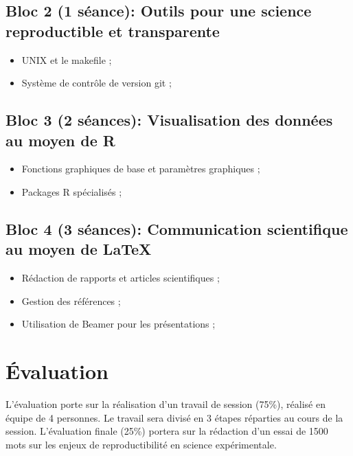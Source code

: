 \documentclass[12]{article}
\begin{document}
	\subsection*{Bloc 2 (1 séance): Outils pour une science reproductible et transparente}

	\begin{itemize}
	\renewcommand{\labelitemi}{$\bullet$}	
		\item UNIX et le makefile ;
		\item Système de contrôle de version git ;
	\end{itemize}


	\subsection*{Bloc 3 (2 séances): Visualisation des données au moyen de R}

	\begin{itemize}
	\renewcommand{\labelitemi}{$\bullet$}	
		\item Fonctions graphiques de base et paramètres graphiques ;
		\item Packages R spécialisés ;
	\end{itemize}


	\subsection*{Bloc 4 (3 séances): Communication scientifique au moyen de LaTeX}

	\begin{itemize}
	\renewcommand{\labelitemi}{$\bullet$}	
		\item Rédaction de rapports et articles scientifiques ;
		\item Gestion des références ;
		\item Utilisation de Beamer pour les présentations ;
	\end{itemize}


	\section*{Évaluation}

	L'évaluation porte sur la réalisation d'un travail de session (75\%), réalisé en équipe de 4 personnes. Le travail sera divisé en 3 étapes réparties au cours de la session. L'évaluation finale (25\%) portera sur la rédaction d'un essai de 1500 mots sur les enjeux de reproductibilité en science expérimentale.  
\end{document}
